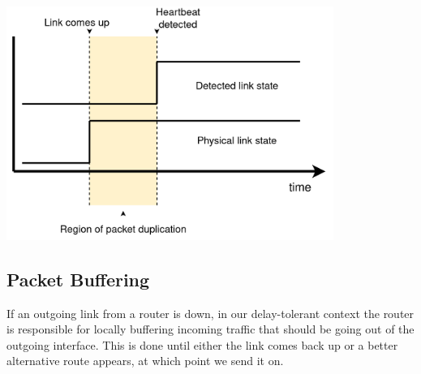 \documentclass[withindex,glossary,openany]{cam-thesis}
\begin{document}
\begin{center}
\begin{minipage}{0.9\textwidth} \centering
	\includegraphics[width=0.8\textwidth]{packet_duplication}
	\label{fig:packet_duplication}
\end{minipage}
\end{center}


\subsection{Packet Buffering}

If an outgoing link from a router is down, in our delay-tolerant context the router is responsible for locally buffering incoming traffic that should be going out of the outgoing interface. This is done until either the link comes back up or a better alternative route appears, at which point we send it on.
\end{document}
